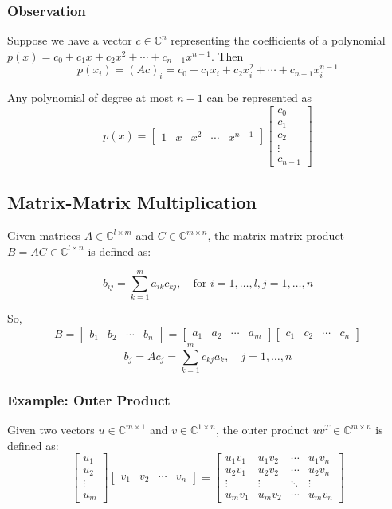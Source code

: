 \documentclass[11pt]{article}
\begin{document}
\subsubsection*{Observation}
Suppose we have a vector \( c \in \mathbb{C}^n \) representing the coefficients of a polynomial \( p(x) = c_0 + c_1 x + c_2 x^2 + \cdots + c_{n-1} x^{n-1} \). Then 
\[p(x_i) = (Ac)_i = c_0 + c_1 x_i + c_2 x_i^2 + \cdots + c_{n-1} x_i^{n-1}\]

Any polynomial of degree at most \( n-1 \) can be represented as
\[p(x) = \begin{bmatrix}
1 & x & x^2 & \cdots & x^{n-1}
\end{bmatrix}
\begin{bmatrix}
c_0 \\
c_1 \\
c_2 \\
\vdots \\
c_{n-1}
\end{bmatrix}
\]

\subsection{Matrix-Matrix Multiplication}
Given matrices \( A \in \mathbb{C}^{l \times m} \) and \( C \in \mathbb{C}^{m \times n} \), the matrix-matrix product \( B = AC \in \mathbb{C}^{l \times n} \) is defined as:

\[
b_{ij} = \sum_{k=1}^{m} a_{ik} c_{kj}, \quad \text{for } i = 1, \ldots, l, j = 1, \ldots, n
\]

So,
\[B = \begin{bmatrix}
b_1 & b_2 & \cdots & b_n
\end{bmatrix} = \begin{bmatrix}
a_1 & a_2 & \cdots & a_m
\end{bmatrix} \begin{bmatrix}
c_1 & c_2 & \cdots & c_n
\end{bmatrix}\]
\[b_j = Ac_j = \sum_{k=1}^{m} c_{kj} a_k, \quad j = 1, \ldots, n\]

\subsubsection*{Example: Outer Product}
Given two vectors \( u \in \mathbb{C}^{m\times 1} \) and \( v \in \mathbb{C}^{1\times n} \), the outer product \( uv^T \in \mathbb{C}^{m \times n} \) is defined as:
\[\begin{bmatrix}
    u_1 \\
    u_2 \\
    \vdots \\
    u_m
\end{bmatrix}
\begin{bmatrix}
    v_1 & v_2 & \cdots & v_n
\end{bmatrix} = \begin{bmatrix}
    u_1 v_1 & u_1 v_2 & \cdots & u_1 v_n \\
    u_2 v_1 & u_2 v_2 & \cdots & u_2 v_n \\
    \vdots & \vdots & \ddots & \vdots \\
    u_m v_1 & u_m v_2 & \cdots & u_m v_n
\end{bmatrix}
\]
\end{document}
